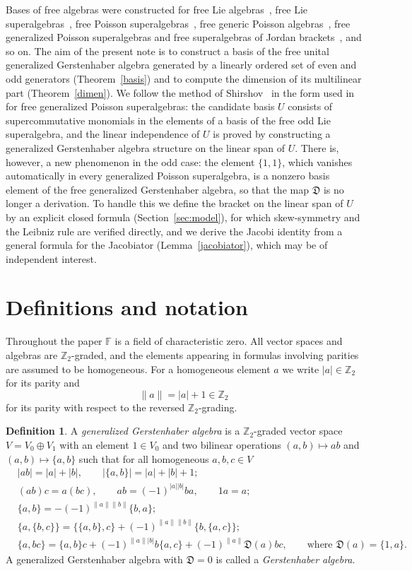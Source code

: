 \documentclass[11pt,reqno]{amsart}
\newcommand{\F}{\mathbb F}
\newcommand{\Z}{\mathbb Z}
\newcommand{\D}{\mathfrak D}
\newcommand{\rp}[1]{\|#1\|}
\theoremstyle{plain}
\theoremstyle{definition}
\newtheorem{definition}[theorem]{Definition}
\theoremstyle{remark}
\begin{document}
Bases of free algebras were constructed for free Lie algebras~\cite{Hall50,shirshov,chi,Reu93}, free Lie superalgebras~\cite{S86,BMPZ,BKLM}, free Poisson superalgebras~\cite{She93}, free generic Poisson algebras~\cite{KSU}, free generalized Poisson superalgebras and free superalgebras of Jordan brackets~\cite{K17}, and so on.
The aim of the present note is to construct a basis of the free unital generalized Gerstenhaber algebra generated by a linearly ordered set of even and odd generators (Theorem~\ref{basis}) and to compute the dimension of its multilinear part (Theorem~\ref{dimen}).
We follow the method of Shirshov~\cite{shirshov} in the form used in~\cite{K17} for free generalized Poisson superalgebras: the candidate basis $U$ consists of supercommutative monomials in the elements of a basis of the free odd Lie superalgebra, and the linear independence of $U$ is proved by constructing a generalized Gerstenhaber algebra structure on the linear span of $U$.
There is, however, a new phenomenon in the odd case: the element $\{1,1\}$, which vanishes automatically in every generalized Poisson superalgebra, is a nonzero basis element of the free generalized Gerstenhaber algebra, so that the map $\D$ is no longer a derivation.
To handle this we define the bracket on the linear span of $U$ by an explicit closed formula (Section~\ref{sec:model}), for which skew-symmetry and the Leibniz rule are verified directly, and we derive the Jacobi identity from a general formula for the Jacobiator (Lemma~\ref{jacobiator}), which may be of independent interest.

\section{Definitions and notation}

Throughout the paper $\F$ is a field of characteristic zero.
All vector spaces and algebras are $\Z_2$-graded, and the elements appearing in formulas involving parities are assumed to be homogeneous.
For a homogeneous element $a$ we write $|a|\in\Z_2$ for its parity and
$$
\rp{a}=|a|+1\in\Z_2
$$
for its parity with respect to the reversed $\Z_2$-grading.

\begin{definition}\label{def}
A \emph{generalized Gerstenhaber algebra} is a $\Z_2$-graded vector space $V=V_0\oplus V_1$ with an element $1\in V_0$ and two bilinear operations $(a,b)\mapsto ab$ and $(a,b)\mapsto\{a,b\}$ such that for all homogeneous $a,b,c\in V$
\begin{align}
&|ab|=|a|+|b|,\qquad |\{a,b\}|=|a|+|b|+1;\label{id:deg}\\
&(ab)c=a(bc),\qquad ab=(-1)^{|a||b|}ba,\qquad 1a=a;\label{id:comm}\\
&\{a,b\}=-(-1)^{\rp a\rp b}\{b,a\};\label{id:skew}\\
&\{a,\{b,c\}\}=\{\{a,b\},c\}+(-1)^{\rp a\rp b}\{b,\{a,c\}\};\label{id:jacobi}\\
&\{a,bc\}=\{a,b\}c+(-1)^{\rp a|b|}b\{a,c\}+(-1)^{\rp a}\D(a)bc,\qquad\text{where } \D(a)=\{1,a\}.\label{id:leibniz}
\end{align}
A generalized Gerstenhaber algebra with $\D=0$ is called a \emph{Gerstenhaber algebra}.
\end{definition}
\end{document}
